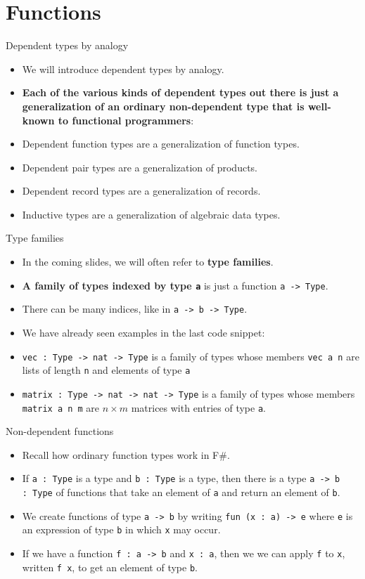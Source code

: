 \documentclass{beamer}
\newcommand{\m}[1]{\texttt{#1}}
\begin{document}
\section{Functions}

\begin{frame}{Dependent types by analogy}
\begin{itemize}
	\item We will introduce dependent types by analogy.
	\item \textbf{Each of the various kinds of dependent types out there is just a generalization of an ordinary non-dependent type that is well-known to functional programmers}:
	\item Dependent function types are a generalization of function types.
	\item Dependent pair types are a generalization of products.
	\item Dependent record types are a generalization of records.
	\item Inductive types are a generalization of algebraic data types.
\end{itemize}
\end{frame}

\begin{frame}{Type families}
\begin{itemize}
	\item In the coming slides, we will often refer to \textbf{type families}.
	\item \textbf{A family of types indexed by type \m{a}} is just a function \m{a -> Type}.
	\item There can be many indices, like in \m{a -> b -> Type}.
	\item We have already seen examples in the last code snippet:
	\item \m{vec :\ Type -> nat -> Type} is a family of types whose members \m{vec a n} are lists of length \m{n} and elements of type \m{a}
	\item \m{matrix :\ Type -> nat -> nat -> Type} is a family of types whose members \m{matrix a n m} are $n \times m$ matrices with entries of type \m{a}.
\end{itemize}
\end{frame}

\begin{frame}{Non-dependent functions}
\begin{itemize}
	\item Recall how ordinary function types work in F\#.
	\item If \m{a :\ Type} is a type and \m{b :\ Type} is a type, then there is a type \m{a -> b :\ Type} of functions that take an element of \m{a} and return an element of \m{b}.
	\item We create functions of type \m{a -> b} by writing \m{fun (x :\ a) -> e} where \m{e} is an expression of type \m{b} in which \m{x} may occur.
	\item If we have a function \m{f :\ a -> b} and \m{x :\ a}, then we we can apply \m{f} to \m{x}, written \m{f x}, to get an element of type \m{b}.
\end{itemize}
\end{frame}
\end{document}
